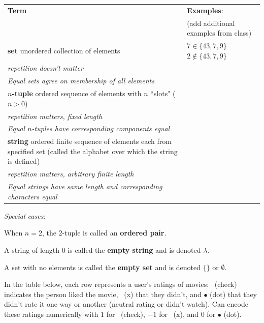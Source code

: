 \documentclass[12pt, oneside]{article}
\newcommand{\cmark}{\ding{51}}
\newcommand{\xmark}{\ding{55}}
\begin{document}
\begin{center}
    \begin{tabular}{|p{4.6in}p{2.6in}|}
    \hline
    {\bf  Term} & {\bf Examples}:\\
    &  (add additional examples from class)\\
    \hline 
    {\bf set} \newline
    unordered collection of elements & $7 \in \{43, 7, 9 \}$ \qquad $2 \notin \{43, 7, 9 \}$ \\
    {\it repetition doesn't matter} & \\
    {\it Equal sets agree on membership of all elements}& \\
    \hline
    {\bf $n$-tuple} \newline
    ordered sequence of elements with $n$ ``slots" ($n >0$) & \\
    {\it repetition matters, fixed length} &\\
    {\it Equal $n$-tuples have corresponding components equal}& \\
    \hline
    {\bf string} \newline
    ordered finite sequence of elements each from specified
    set (called the alphabet over which the string is defined)& \\
    {\it repetition matters, arbitrary finite length} &\\
    {\it Equal strings have same length and corresponding characters equal}\\
    \hline
    \end{tabular}
\end{center}

{\it Special cases}: 

When $n=2$, the 2-tuple is called an {\bf ordered pair}.

A string of length $0$ is called the {\bf empty string} and is denoted $\lambda$.

A set with no elements is called the {\bf empty set} and is denoted $\{\}$ or $\emptyset$. \newpage


In the table  below,  each row represents a user's ratings of movies: 
\cmark~(check) indicates the person liked the movie, \xmark~(x)
that they didn't, and $\bullet$ (dot) that they didn't rate it one way or 
another (neutral rating or didn't watch). Can encode
these ratings numerically with $1$ for \cmark~(check), $-1$ for \xmark~(x), 
and $0$ for $\bullet$ (dot).

\vfill
\end{document}
